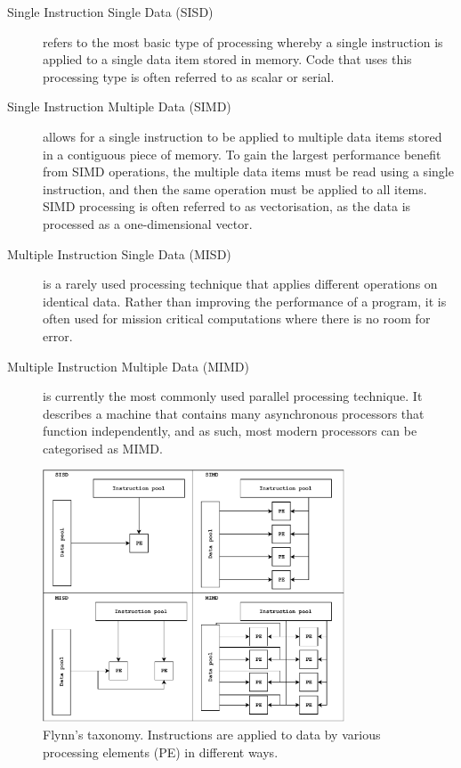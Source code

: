 \documentclass[a4paper,11pt]{report}
\begin{document}
\begin{description}
	\item[Single Instruction Single Data (SISD)] refers to the most basic type of processing whereby a single instruction is applied to a single data item stored in memory. Code that uses this processing type is often referred to as scalar or serial. 
	
	\item[Single Instruction Multiple Data (SIMD)] allows for a single instruction to be applied to multiple data items stored in a contiguous piece of memory. To gain the largest performance benefit from SIMD operations, the multiple data items must be read using a single instruction, and then the same operation must be applied to all items. SIMD processing is often referred to as vectorisation, as the data is processed as a one-dimensional vector. 
	
	\item[Multiple Instruction Single Data (MISD)] is a rarely used processing technique that applies different operations on identical data. Rather than improving the performance of a program, it is often used for mission critical computations where there is no room for error. 
	
	\item[Multiple Instruction Multiple Data (MIMD)] is currently the most commonly used parallel processing technique. It describes a machine that contains many asynchronous processors that function independently, and as such, most modern processors can be categorised as MIMD.
\end{description}
\par
\begin{figure}[htbp]
\begin{center}
\includegraphics[width=0.8\textwidth]{img/Flynns.pdf}
\caption[Flynn's taxonomy]{Flynn's taxonomy. Instructions are applied to data by various processing elements (PE) in different ways. }
\label{fig:Flynn's}
\end{center}
\end{figure}
\end{document}
